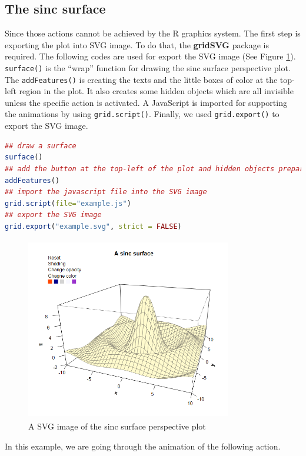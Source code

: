 \documentclass[11pt,twoside]{report}
\begin{document}
\subsection{The sinc surface}
Since those actions cannot be achieved by the R graphics system. The first step is exporting the plot into SVG image. To do that, the \textbf{gridSVG} package is required. The following codes are used for export the SVG image (See Figure \ref{Example_6.3.01}). \texttt{surface()} is the ``wrap'' function for drawing the sinc surface perspective plot.
The \texttt{addFeatures()} is creating the texts and the little boxes of color at the top-left region in the plot.
It also creates some hidden objects which are all invisible unless the specific action is activated. A
JavaScript is imported for supporting the animations by using \texttt{grid.script()}. Finally, we used \texttt{grid.export()} to export the SVG image.
\begin{lstlisting}[language = R]
## draw a surface
surface()  
## add the button at the top-left of the plot and hidden objects prepare for animation
addFeatures() 
## import the javascript file into the SVG image
grid.script(file="example.js") 
## export the SVG image
grid.export("example.svg", strict = FALSE) 
\end{lstlisting}
\begin{figure}[h]
	\begin{center}
		\includegraphics[height = 8cm, width = 9cm]{figure/svg/origin_1.PNG}
		\caption{A SVG image of the sinc surface perspective plot}
		\label{Example_6.3.01}
	\end{center}
\end{figure}



\newpage
In this example, we are going through the animation of the following action. 
\end{document}
